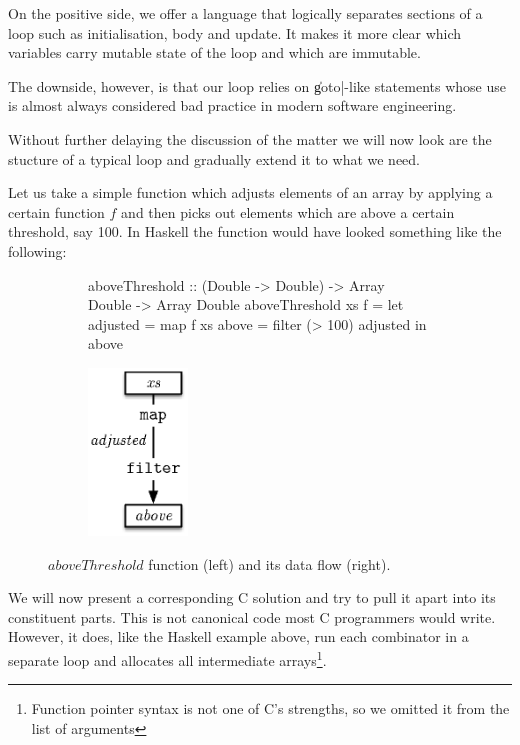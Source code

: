 \documentclass[preamble.tex]{subfiles}
\begin{document}
On the positive side, we offer a language that logically separates sections of a loop such as initialisation, body and update. It makes it more clear which variables carry mutable state of the loop and which are immutable.

The downside, however, is that our loop relies on \|goto|-like statements whose use is almost always considered bad practice in modern software engineering.

Without further delaying the discussion of the matter we will now look are the stucture of a typical loop and gradually extend it to what we need.

Let us take a simple function which adjusts elements of an array by applying a certain function $f$ and then picks out elements which are above a certain threshold, say 100. In Haskell the function would have looked something like the following:

\begin{figure}
\begin{subfigure}{.7\textwidth}
  \begin{hscode}
  aboveThreshold :: (Double -> Double)
                 -> Array Double
                 -> Array Double
  aboveThreshold xs f
    = let adjusted = map f xs
          above    = filter (> 100) adjusted
      in  above
  \end{hscode}
\end{subfigure}%
\begin{subfigure}{.3\textwidth}
  \includegraphics[height=12em]{img/aboveThreshold}
\end{subfigure}
\caption{$aboveThreshold$ function (left) and its data flow (right).}
\label{fig:Loops:aboveThreshold}
\end{figure}

We will now present a corresponding C solution and try to pull it apart into its constituent parts. This is not canonical code most C programmers would write. However, it does, like the Haskell example above, run each combinator in a separate loop and allocates all intermediate arrays\footnote{Function pointer syntax is not one of C's strengths, so we omitted it from the list of arguments}.
\end{document}
